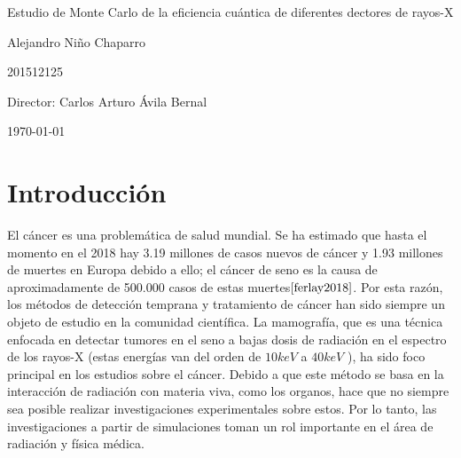 \documentclass[12pt]{article}
\begin{document}
\begin{center}
\Huge
Estudio de Monte Carlo de la eficiencia cuántica de diferentes dectores de rayos-X

\vspace{5mm}
\Large Alejandro Niño Chaparro

\large
201512125


\vspace{2mm}
\Large
Director: Carlos Arturo Ávila Bernal

\normalsize
\vspace{2mm}

\today
\end{center}


\normalsize
\section{Introducción}

El cáncer es una problemática de salud mundial. Se ha estimado que hasta el momento en el 2018 hay 3.19 millones de casos nuevos de cáncer y 1.93 millones de muertes en Europa debido a ello; el cáncer de seno es la causa de aproximadamente de 500.000 casos de estas muertes$\cite{ferlay2018}$.  Por esta razón, los métodos de detección temprana y tratamiento de cáncer han sido siempre un objeto de estudio en la comunidad científica. La mamografía, que es una técnica enfocada en detectar tumores en el seno a bajas dosis de radiación en el espectro de los rayos-X (estas energías van del orden de $10keV$ a $40keV$ ), ha sido foco principal en los estudios sobre el cáncer. Debido a que este método se basa en la interacción de radiación con materia viva, como los organos, hace que no siempre sea posible realizar investigaciones experimentales sobre estos. Por lo tanto, las investigaciones a partir de simulaciones toman un rol importante en el área de radiación y física médica.
\vspace{3mm}
\end{document}
